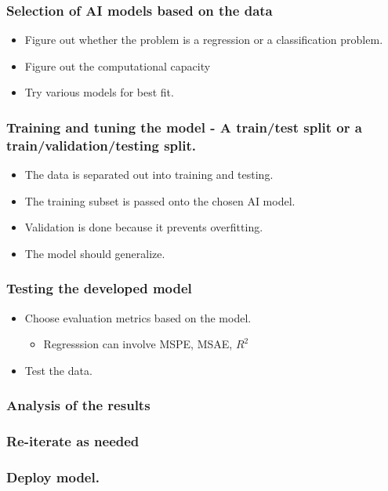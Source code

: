\documentclass[11pt]{article}
\begin{document}
\subsubsection{Selection of AI models based on the data}
\label{sec:org482227b}
\begin{itemize}
\item Figure out whether the problem is a regression or a classification problem.
\item Figure out the computational capacity
\item Try various models for best fit.
\end{itemize}
\subsubsection{Training and tuning the model - A train/test split or a train/validation/testing split.}
\label{sec:org9fe0ba1}
\begin{itemize}
\item The data is separated out into training and testing.
\item The training subset is passed onto the chosen AI model.
\item Validation is done because it prevents overfitting.
\item The model should generalize.
\end{itemize}
\subsubsection{Testing the developed model}
\label{sec:org0ebb906}
\begin{itemize}
\item Choose evaluation metrics based on the model.
\begin{itemize}
\item Regresssion can involve MSPE, MSAE, \(R^2\)
\end{itemize}
\item Test the data.
\end{itemize}
\subsubsection{Analysis of the results}
\label{sec:org1f9fe31}
\subsubsection{Re-iterate as needed}
\label{sec:orgf4de405}
\subsubsection{Deploy model.}
\label{sec:orgf1c4700}
\end{document}

